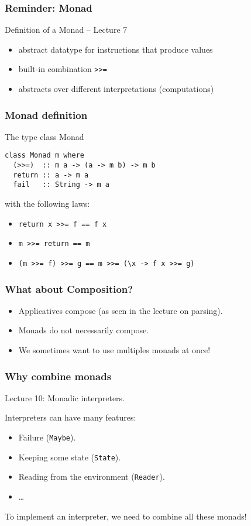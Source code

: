 \documentclass[pdftex,aspectratio=169]{beamer}
\author[Gabriel Radanne]{Dr. Gabriel Radanne}
\subtitle
{Monad Transformers}
\begin{document}
\begin{frame}
  \titlepage
\end{frame}

\begin{frame}
  \frametitle{Reminder: Monad}
  \begin{block}{Definition of a Monad -- Lecture 7}
    \begin{itemize}
    \item abstract datatype for instructions that produce values
    \item built-in combination \lstinline{>>=}
    \item abstracts over different interpretations (computations)
    \end{itemize}
  \end{block}
\end{frame}

\begin{frame}[fragile]
  \frametitle{Monad definition}
  \begin{block}{The type class Monad}
\begin{lstlisting}
class Monad m where
  (>>=)  :: m a -> (a -> m b) -> m b
  return :: a -> m a
  fail   :: String -> m a
\end{lstlisting}

with the following laws:
\begin{itemize}
\item \lstinline{return x >>= f == f x}
\item \lstinline{m >>= return == m}
\item \lstinline{(m >>= f) >>= g == m >>= (\x -> f x >>= g)}
\end{itemize}

\end{block}
\end{frame}

\begin{frame}
  \frametitle{What about Composition?}
  \begin{itemize}[<+->]
  \item Applicatives compose (as seen in the lecture on parsing).
  \item Monads do not necessarily compose.
  \item We sometimes want to use multiples monads at once!
  \end{itemize}
\end{frame}

\begin{frame}
  \frametitle{Why combine monads}
  Lecture 10: Monadic interpreters.

  Interpreters can have many features:
  \begin{itemize}
  \item Failure (\lstinline{Maybe}).
  \item Keeping some state (\lstinline{State}).
  \item Reading from the environment (\lstinline{Reader}).
  \item \dots
  \end{itemize}

  To implement an interpreter, we need to combine all these monads!
\end{frame}
\end{document}
